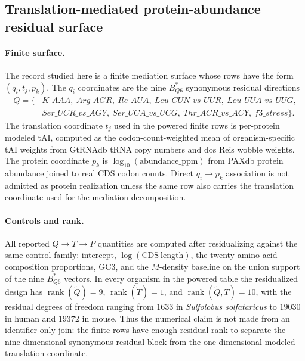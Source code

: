 \subsection{Translation-mediated protein-abundance residual surface}
\label{sec:q6-translation-mediated-protein-abundance-cross-layer}

\paragraph{Finite surface.}
The record studied here is a finite mediation surface whose rows have the form $(q_i,t_j,p_k)$.  The $q_i$ coordinates are the nine $B^*_{Q6}$ synonymous residual directions
$$
\begin{aligned}
Q=\{&K\_AAA,\ Arg\_AGR,\ Ile\_AUA,\ Leu\_CUN\_vs\_UUR,\ Leu\_UUA\_vs\_UUG,\\
&Ser\_UCR\_vs\_AGY,\ Ser\_UCA\_vs\_UCG,\ Thr\_ACR\_vs\_ACY,\ f3\_stress\}.
\end{aligned}
$$
The translation coordinate $t_j$ used in the powered finite rows is per-protein modeled tAI, computed as the codon-count-weighted mean of organism-specific tAI weights from GtRNAdb tRNA copy numbers and dos Reis wobble weights.  The protein coordinate $p_k$ is $\log_{10}(\mathrm{abundance\_ppm})$ from PAXdb protein abundance joined to real CDS codon counts.  Direct $q_i\to p_k$ association is not admitted as protein realization unless the same row also carries the translation coordinate used for the mediation decomposition.

\paragraph{Controls and rank.}
All reported $Q\to T\to P$ quantities are computed after residualizing against the same control family: intercept, $\log(\mathrm{CDS\ length})$, the twenty amino-acid composition proportions, GC3, and the $M$-density baseline on the union support of the nine $B^*_{Q6}$ vectors.  In every organism in the powered table the residualized design has $\operatorname{rank}(\widetilde Q)=9$, $\operatorname{rank}(\widetilde T)=1$, and $\operatorname{rank}(\widetilde Q,\widetilde T)=10$, with the residual degrees of freedom ranging from $1633$ in \emph{Sulfolobus solfataricus} to $19030$ in human and $19372$ in mouse.  Thus the numerical claim is not made from an identifier-only join: the finite rows have enough residual rank to separate the nine-dimensional synonymous residual block from the one-dimensional modeled translation coordinate.

